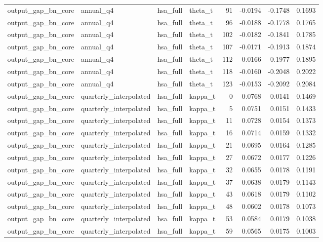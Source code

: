 \begin{tabular}{llllrrrr}
output\_gap\_bn\_core & annual\_q4 & hsa\_full & theta\_t & 91 & -0.0194 & -0.1748 & 0.1693 \\
output\_gap\_bn\_core & annual\_q4 & hsa\_full & theta\_t & 96 & -0.0188 & -0.1778 & 0.1765 \\
output\_gap\_bn\_core & annual\_q4 & hsa\_full & theta\_t & 102 & -0.0182 & -0.1841 & 0.1785 \\
output\_gap\_bn\_core & annual\_q4 & hsa\_full & theta\_t & 107 & -0.0171 & -0.1913 & 0.1874 \\
output\_gap\_bn\_core & annual\_q4 & hsa\_full & theta\_t & 112 & -0.0166 & -0.1977 & 0.1895 \\
output\_gap\_bn\_core & annual\_q4 & hsa\_full & theta\_t & 118 & -0.0160 & -0.2048 & 0.2022 \\
output\_gap\_bn\_core & annual\_q4 & hsa\_full & theta\_t & 123 & -0.0153 & -0.2092 & 0.2084 \\
output\_gap\_bn\_core & quarterly\_interpolated & hsa\_full & kappa\_t & 0 & 0.0768 & 0.0141 & 0.1469 \\
output\_gap\_bn\_core & quarterly\_interpolated & hsa\_full & kappa\_t & 5 & 0.0751 & 0.0151 & 0.1433 \\
output\_gap\_bn\_core & quarterly\_interpolated & hsa\_full & kappa\_t & 11 & 0.0728 & 0.0154 & 0.1373 \\
output\_gap\_bn\_core & quarterly\_interpolated & hsa\_full & kappa\_t & 16 & 0.0714 & 0.0159 & 0.1332 \\
output\_gap\_bn\_core & quarterly\_interpolated & hsa\_full & kappa\_t & 21 & 0.0695 & 0.0164 & 0.1285 \\
output\_gap\_bn\_core & quarterly\_interpolated & hsa\_full & kappa\_t & 27 & 0.0672 & 0.0177 & 0.1226 \\
output\_gap\_bn\_core & quarterly\_interpolated & hsa\_full & kappa\_t & 32 & 0.0655 & 0.0178 & 0.1191 \\
output\_gap\_bn\_core & quarterly\_interpolated & hsa\_full & kappa\_t & 37 & 0.0638 & 0.0179 & 0.1143 \\
output\_gap\_bn\_core & quarterly\_interpolated & hsa\_full & kappa\_t & 43 & 0.0618 & 0.0179 & 0.1102 \\
output\_gap\_bn\_core & quarterly\_interpolated & hsa\_full & kappa\_t & 48 & 0.0602 & 0.0178 & 0.1073 \\
output\_gap\_bn\_core & quarterly\_interpolated & hsa\_full & kappa\_t & 53 & 0.0584 & 0.0179 & 0.1038 \\
output\_gap\_bn\_core & quarterly\_interpolated & hsa\_full & kappa\_t & 59 & 0.0565 & 0.0175 & 0.1003 \\

\end{tabular}
